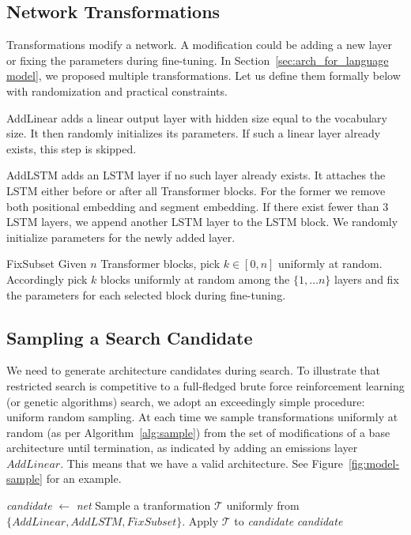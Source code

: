 \documentclass[11pt,a4paper]{article}
\begin{document}
\subsection{Network Transformations}
\label{sec:nettransformation}

Transformations modify a network. A modification could be adding a new layer or fixing the parameters during fine-tuning. In Section~\ref{sec:arch_for_language model}, we proposed multiple transformations. Let us define them formally below with randomization and practical constraints.

\begin{description*}
\item[AddLinear] adds a linear output layer with hidden size equal to the vocabulary size. It then randomly initializes its parameters. If such a linear layer already exists, this step is skipped.
\item[AddLSTM] adds an LSTM layer if no such layer already exists. It attaches the LSTM either before or after all Transformer blocks. For the former we remove both positional embedding and segment embedding. If there exist fewer than 3 LSTM layers, we append another LSTM layer to the LSTM block. We randomly initialize parameters for the newly added layer.
\item[FixSubset] Given $n$ Transformer blocks, pick $k \in [0, n]$ uniformly at random. Accordingly pick $k$ blocks uniformly at random among the $\{1, \ldots n\}$ layers and fix the parameters for each selected block during fine-tuning.
\end{description*}




\subsection{Sampling a Search Candidate}

We need to generate architecture candidates during search. To
illustrate that restricted search is competitive to a
full-fledged brute force reinforcement learning (or genetic algorithms)
search, we adopt an exceedingly simple procedure: uniform random
sampling. At each time we sample transformations uniformly at random
(as per Algorithm~\ref{alg:sample}) from the set of modifications of a
base architecture until termination, as indicated by adding an
emissions layer $\mathit{AddLinear}$. This means that we have a valid
architecture. See Figure~\ref{fig:model-sample} for an example. 

\begin{algorithm}[tb]
\caption{\label{alg:sample}{Search Candidate Sampling}}
\begin{algorithmic}[1]
\STATE \emph{candidate} $\gets$ \emph{net}
\REPEAT
\STATE Sample a tranformation $\mathcal{T}$ uniformly from $\{\mathit{AddLinear}, \mathit{AddLSTM}, \mathit{FixSubset}\}$.
\STATE Apply $\mathcal{T}$ to \emph{candidate}
\RETURN \emph{candidate}
\end{algorithmic}
\end{algorithm}
\end{document}
